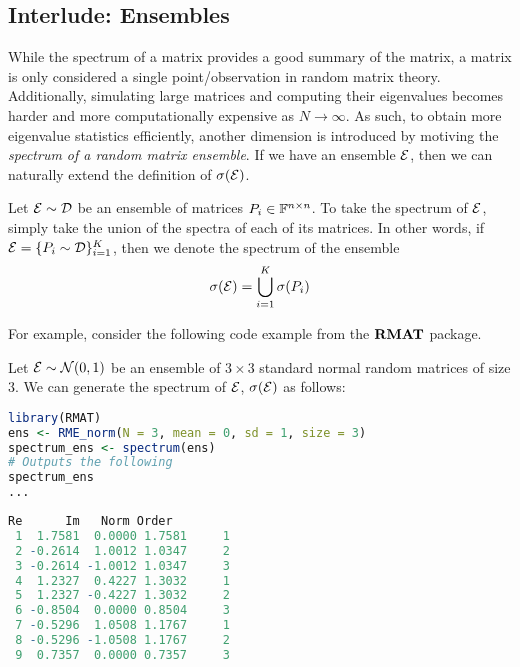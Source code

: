 \newpage
\subsection{Interlude: Ensembles}
While the spectrum of a matrix provides a good summary of the matrix, a matrix is only considered a single point/observation in random matrix theory.
Additionally, simulating large matrices and computing their eigenvalues becomes harder and more computationally expensive as $N \to \infty$.
As such, to obtain more eigenvalue statistics efficiently, another dimension is introduced by motiving the \textit{spectrum of a random matrix ensemble}.
If we have an ensemble $\mathcal{E}$, then we can naturally extend the definition of $\sigma(\mathcal{E})$.

\begin{definition}
Let $\mathcal{E} \sim \mathcal{D}$ be an ensemble of matrices $P_i \in \mathbb{F}^{n \times n}$. To take the spectrum of $\mathcal{E}$, simply take the union of the spectra of each of its matrices.
In other words, if $\mathcal{E} = \{P_i \sim \mathcal{D}\}_{i = 1}^K$, then we denote the spectrum of the ensemble
$$\sigma(\mathcal{E}) = \bigcup_{i=1}^K \sigma(P_i)$$
\end{definition}

\medskip
For example, consider the following code example from the ${\textbf{RMAT}}$ package.
\begin{code}
Let $\mathcal{E} \sim \mathcal{N}(0,1)$ be an ensemble of $3 \times 3$ standard normal random matrices of size $3$. We can generate the spectrum of $\mathcal{E}$, $\sigma(\mathcal{E})$ as follows:
\end{code}

\begin{lstlisting}[language=R]
library(RMAT)
ens <- RME_norm(N = 3, mean = 0, sd = 1, size = 3)
spectrum_ens <- spectrum(ens)
# Outputs the following
spectrum_ens
...
\end{lstlisting}

\begin{lstlisting}[language=R]
        Re      Im   Norm Order
 1  1.7581  0.0000 1.7581     1
 2 -0.2614  1.0012 1.0347     2
 3 -0.2614 -1.0012 1.0347     3
 4  1.2327  0.4227 1.3032     1
 5  1.2327 -0.4227 1.3032     2
 6 -0.8504  0.0000 0.8504     3
 7 -0.5296  1.0508 1.1767     1
 8 -0.5296 -1.0508 1.1767     2
 9  0.7357  0.0000 0.7357     3
\end{lstlisting}

